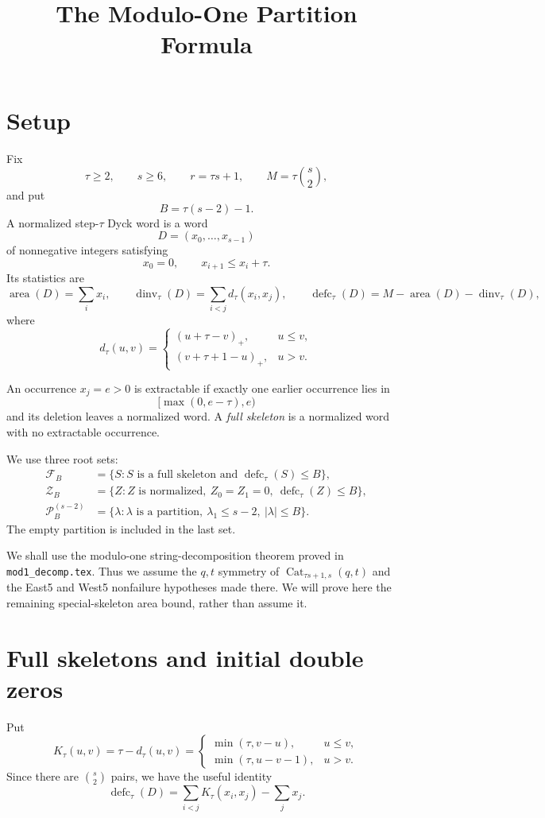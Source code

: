 \documentclass[11pt]{article}
\title{The Modulo-One Partition Formula}
\author{}
\date{}
\theoremstyle{definition}
\theoremstyle{remark}
\newcommand{\area}{\operatorname{area}}
\newcommand{\dinv}{\operatorname{dinv}}
\newcommand{\defc}{\operatorname{defc}}
\newcommand{\Cat}{\operatorname{Cat}}
\begin{document}
\maketitle

\section{Setup}

Fix
\[
  \tau\ge2,\qquad s\ge6,\qquad r=\tau s+1,
  \qquad M=\tau\binom{s}{2},
\]
and put
\[
  B=\tau(s-2)-1.
\]
A normalized step-$\tau$ Dyck word is a word
\[
  D=(x_0,\ldots,x_{s-1})
\]
of nonnegative integers satisfying
\[
  x_0=0,
  \qquad x_{i+1}\le x_i+\tau.
\]
Its statistics are
\[
 \area(D)=\sum_i x_i,
 \qquad
 \dinv_\tau(D)=\sum_{i<j}d_\tau(x_i,x_j),
 \qquad
 \defc_\tau(D)=M-\area(D)-\dinv_\tau(D),
\]
where
\[
 d_\tau(u,v)=
 \begin{cases}
   (u+\tau-v)_+,&u\le v,\\
   (v+\tau+1-u)_+,&u>v.
 \end{cases}
\]

An occurrence $x_j=e>0$ is extractable if exactly one earlier occurrence
lies in
\[
  [\max(0,e-\tau),e)
\]
and its deletion leaves a normalized word.  A \emph{full skeleton} is a
normalized word with no extractable occurrence.

We use three root sets:
\begin{align*}
 \mathcal F_B
   &=\{S:S\text{ is a full skeleton and }\defc_\tau(S)\le B\},\\
 \mathcal Z_B
   &=\{Z:Z\text{ is normalized},\ Z_0=Z_1=0,
                    \ \defc_\tau(Z)\le B\},\\
 \mathcal P_B^{(s-2)}
   &=\{\lambda:\lambda\text{ is a partition},\
          \lambda_1\le s-2,\ |\lambda|\le B\}.
\end{align*}
The empty partition is included in the last set.

We shall use the modulo-one string-decomposition theorem proved in
\texttt{mod1\_decomp.tex}.  Thus we assume the $q,t$ symmetry of
$\Cat_{\tau s+1,s}(q,t)$ and the East5 and West5 nonfailure hypotheses made
there.  We will prove here the remaining special-skeleton area bound, rather
than assume it.

\section{Full skeletons and initial double zeros}

Put
\[
 K_\tau(u,v)=\tau-d_\tau(u,v)
 =
 \begin{cases}
   \min(\tau,v-u),&u\le v,\\
   \min(\tau,u-v-1),&u>v.
 \end{cases}
\]
Since there are $\binom{s}{2}$ pairs, we have the useful identity
\begin{equation}
 \defc_\tau(D)
 =\sum_{i<j}K_\tau(x_i,x_j)-\sum_jx_j.
 \label{eq:defect-kernel}
\end{equation}
\end{document}
